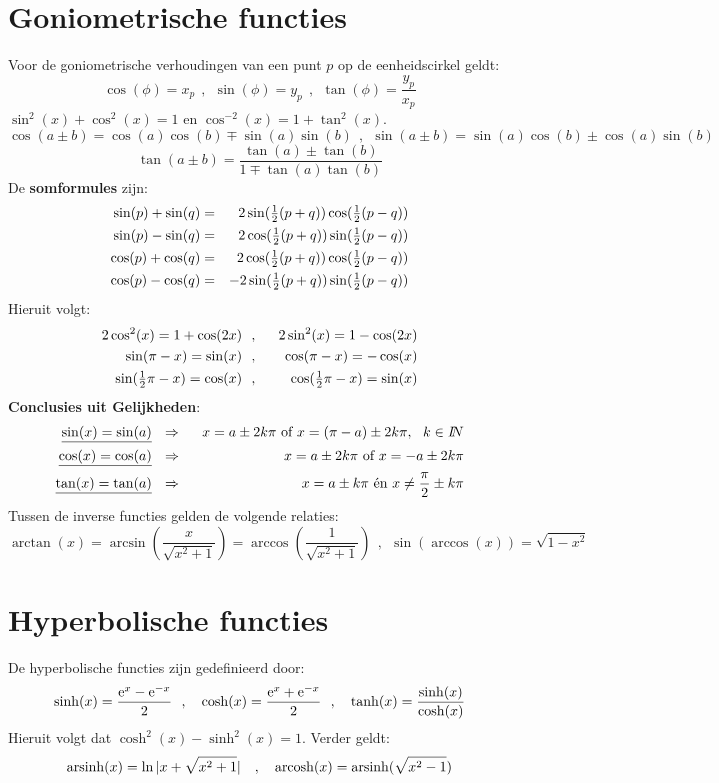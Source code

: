 \section{Goniometrische functies}
Voor de goniometrische verhoudingen van een punt $p$ op de eenheidscirkel geldt:
\[
\cos(\phi)=x_p~~,~~\sin(\phi)=y_p~~,~~\tan(\phi)=\frac{y_p}{x_p}
\]
$\sin^2(x)+\cos^2(x)=1$ en $\cos^{-2}(x)=1+\tan^2(x)$.
\[
\cos(a\pm b)=\cos(a)\cos(b)\mp\sin(a)\sin(b)~~,~~
\sin(a\pm b)=\sin(a)\cos(b)\pm\cos(a)\sin(b)
\]
\[
\tan(a\pm b)=\frac{\tan(a)\pm\tan(b)}{1\mp\tan(a)\tan(b)}
\]
De {\bf somformules} zijn:
\begin{eqnarray*}
\sin(p)+\sin(q)&=&2\sin(\mbox{$\frac{1}{2}$}(p+q))\cos(\mbox{$\frac{1}{2}$}(p-q))\\
\sin(p)-\sin(q)&=&2\cos(\mbox{$\frac{1}{2}$}(p+q))\sin(\mbox{$\frac{1}{2}$}(p-q))\\
\cos(p)+\cos(q)&=&2\cos(\mbox{$\frac{1}{2}$}(p+q))\cos(\mbox{$\frac{1}{2}$}(p-q))\\
\cos(p)-\cos(q)&=&-2\sin(\mbox{$\frac{1}{2}$}(p+q))\sin(\mbox{$\frac{1}{2}$}(p-q))\\
\end{eqnarray*}
Hieruit volgt:
\begin{eqnarray*}
2\cos^2(x)=1+\cos(2x)   &~~,~~&2\sin^2(x)=1-\cos(2x)\\
\sin(\pi-x)=\sin(x)     &~~,~~&\cos(\pi-x)=-\cos(x)\\
\sin(\mbox{$\frac{1}{2}$}\pi-x)=\cos(x)&~~,~~&\cos(\mbox{$\frac{1}{2}$}\pi-x)=\sin(x)
\end{eqnarray*}
{\bf Conclusies uit Gelijkheden}:
\begin{eqnarray*}
\underline{\sin(x)=\sin(a)}&~~\Rightarrow~~&x=a\pm2k\pi\mbox{ of }x=(\pi-a)\pm2k\pi,~~k\in I\hspace{-1mm}N\\
\underline{\cos(x)=\cos(a)}&~~\Rightarrow~~&x=a\pm2k\pi\mbox{ of }x=-a\pm2k\pi\\
\underline{\tan(x)=\tan(a)}&~~\Rightarrow~~&x=a\pm k\pi\mbox{ \'en }x\neq\frac{\pi}{2}\pm k\pi
\end{eqnarray*}
Tussen de inverse functies gelden de volgende relaties:
\[
\arctan(x)=\arcsin\left(\frac{x}{\sqrt{x^2+1}}\right)=\arccos\left(\frac{1}{\sqrt{x^2+1}}\right)~~,~~
\sin(\arccos(x))=\sqrt{1-x^2}
\]

\section{Hyperbolische functies}
De hyperbolische functies zijn gedefinieerd door:
\[
\sinh(x)=\frac{{\rm e}^x-{\rm e}^{-x}}{2}~~,~~~\cosh(x)=\frac{{\rm e}^x+{\rm e}^{-x}}{2}~~,~~~\tanh(x)=\frac{\sinh(x)}{\cosh(x)}
\]
Hieruit volgt dat $\cosh^2(x)-\sinh^2(x)=1$. Verder geldt:
\[
{\rm arsinh}(x)=\ln|x+\sqrt{x^2+1}|~~~,~~~{\rm arcosh}(x)={\rm arsinh}(\sqrt{x^2-1})
\]


